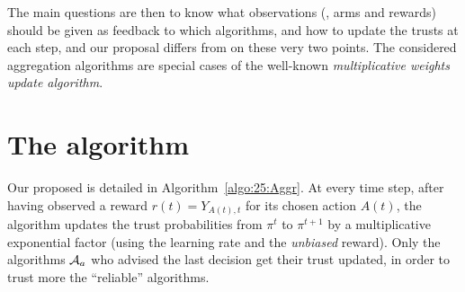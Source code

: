 The main questions are then to know what observations (\ie, arms and rewards) should be given as feedback to which algorithms,
and how to update the trusts at each step, and our proposal \Aggr{} differs from \ExpQ{} on these very two points.
%
The considered aggregation algorithms are special cases of the well-known \emph{multiplicative weights update algorithm}.



\section{The \Aggr{} algorithm}\label{sub:25:Aggr}


Our proposed \Aggr{} is detailed in Algorithm~\ref{algo:25:Aggr}.
%
At every time step, after having observed a reward $r(t)=Y_{A(t),t}$ for its chosen action $A(t)$,
the algorithm updates the trust probabilities from $\pi^t$ to $\pi^{t+1}$ by
a multiplicative exponential factor (using the learning rate and the \emph{unbiased} reward).
%
Only the algorithms $\mathcal{A}_a$ who advised the last decision get their trust updated, in order to trust more the ``reliable'' algorithms.

